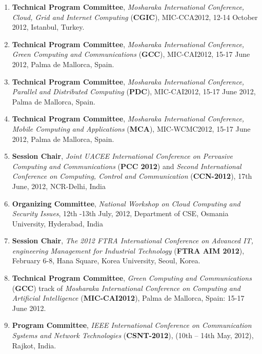 \begin{enumerate}
\item
\textbf{Technical Program Committee}, \textit{Mosharaka International Conference, Cloud, Grid and Internet Computing} (\textbf{CGIC}), MIC-CCA2012, 12-14 October 2012, Istanbul, Turkey.

\item
\textbf{Technical Program Committee}, \textit{Mosharaka International Conference, Green Computing and Communications} (\textbf{GCC}), MIC-CAI2012, 15-17 June 2012, Palma de Mallorca, Spain.

\item
\textbf{Technical Program Committee},\textit{ Mosharaka International Conference, Parallel and Distributed Computing} (\textbf{PDC}), MIC-CAI2012, 15-17 June 2012, Palma de Mallorca, Spain.

\item
\textbf{Technical Program Committee},\textit{ Mosharaka International Conference, Mobile Computing and Applications} (\textbf{MCA}), MIC-WCMC2012, 15-17 June 2012,  Palma de Mallorca, Spain.

\item
\textbf{Session Chair},\textit{ Joint UACEE International Conference on Pervasive Computing and Communications} (\textbf{PCC 2012}) and \textit{Second International Conference on Computing, Control and Communication }(\textbf{CCN-2012}), 17th June, 2012, NCR-Delhi, India

\item
\textbf{Organizing Committee}, \textit{National Workshop on Cloud Computing and Security Issues}, 12th -13th July, 2012, Department of CSE, Osmania University, Hyderabad, India

\item
\textbf{Session Chair}, \textit{The 2012 FTRA International Conference on Advanced IT, engineering Management for Industrial Technology} (\textbf{FTRA AIM 2012}), February 6-8, Hana Square, Korea University, Seoul, Korea.

\item
\textbf{Technical Program Committee}, \textit{Green Computing and Communications} (\textbf{GCC}) track of \textit{Mosharaka International Conference on Computing and Artificial Intelligence} (\textbf{MIC-CAI2012}), Palma de Mallorca, Spain: 15-17 June 2012. 

\item
\textbf{Program Committee}, \textit{IEEE International Conference on Communication Systems and Network Technologies} (\textbf{CSNT-2012}), (10th – 14th May, 2012), Rajkot, India.


\end{enumerate}
